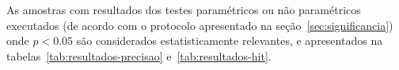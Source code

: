 \documentclass[12pt,openany,oneside,a4paper,english,brazil]{abntbibufjf}
\begin{document}
 As amostras com resultados dos testes paramétricos ou não paramétricos executados (de acordo com o protocolo apresentado na seção~\ref{sec:significancia}) onde $ p < 0.05 $ são considerados estatisticamente relevantes, e apresentados na tabelas~\ref{tab:resultados-precisao} e~\ref{tab:resultados-hit}.

 \begin{table}[htbp]
 \caption{Comparação da precisão apontando para diferenças estatisticamente relevantes}
 \begin{center}
\end{center}
\end{table}
\end{document}
